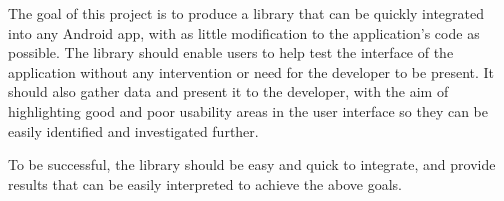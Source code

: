 The goal of this project is to produce a library that can be quickly integrated into
any Android app, with as little modification to the application's code
as possible. The library should enable users to help test the interface
of the application without any intervention or need for the developer to
be present. It should also gather data and present it to the developer,
with the aim of highlighting good and poor usability areas in the user interface
so they can be easily identified and investigated further.

To be successful, the library should be easy and quick to integrate, and
provide results that can be easily interpreted to achieve the above goals.
